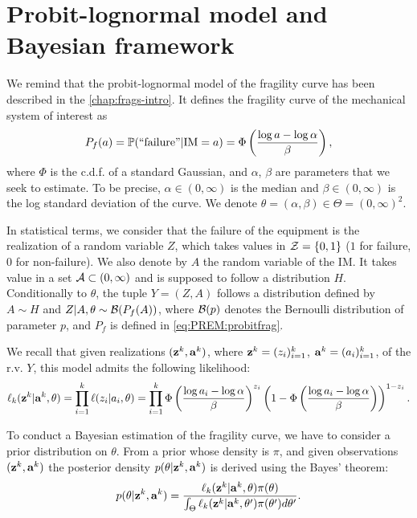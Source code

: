 \section{Probit-lognormal model and Bayesian framework}\label{sec:PREM:model}

We remind that the probit-lognormal model of the fragility curve has been described in the \cref{chap:frags-intro}.
It defines the fragility curve of the mechanical system of interest as 
\begin{equation}\label{eq:PREM:probitfrag}
    P_f(a)=\mathbb{P}(\text{``failure''}|\text{IM}=a) = \Phi\left(\frac{\log a-\log\alpha}{\beta}\right),
\end{equation}
where $\Phi$ is the c.d.f. of a standard Gaussian, and $\alpha$, $\beta$ are parameters that we seek to estimate. To be precise, $\alpha\in(0,\infty)$ is the median and $\beta\in(0,\infty)$ is the log standard deviation of the curve. We denote $\theta=(\alpha,\beta)\in\Theta=(0,\infty)^2$.

In statistical terms, we consider that the failure of the equipment is the realization of a random variable $Z$, which takes values in $\mathcal{Z}=\{0,1\}$ ($1$ for failure, $0$ for non-failure). We also denote by $A$ the random variable of the IM. It takes value in a set $\mathcal{A}\subset(0,\infty)$ and is supposed to follow a distribution $H$. Conditionally to $\theta$, the tuple $Y=(Z,A)$ follows a distribution defined by $A\sim H$ and $Z|A,\theta\sim\mathcal{B}(P_f(A))$, where $\mathcal{B}(p)$ denotes the Bernoulli distribution of parameter $p$, and $P_f$ is defined in \cref{eq:PREM:probitfrag}.

We recall that given realizations $(\mathbf{z}^k,\mathbf{a}^k)$, where $\mathbf{z}^k=(z_i)_{i=1}^k$, $\mathbf{a}^k=(a_i)_{i=1}^k$, of the r.v. $Y$, this model admits the following likelihood:
\begin{equation}\label{eq:PREM:likelihood}
    \ell_k(\mathbf{z}^k|\mathbf{a}^k,\theta) = \prod_{i=1}^k\ell(z_i|a_i,\theta) = \prod_{i=1}^k\Phi\left(\frac{\log a_i-\log\alpha}{\beta}\right)^{z_i}\left(1-\Phi\left(\frac{\log a_i-\log\alpha}{\beta}\right)\right)^{1-z_i}.
\end{equation}


To conduct a Bayesian estimation of the fragility curve, we have to consider a prior distribution on $\theta$.
From a prior whose density is $\pi$, and given observations $(\mathbf{z}^k,\mathbf{a}^k)$ the posterior density $p(\theta|\mathbf{z}^k,\mathbf{a}^k)$ is derived using the Bayes' theorem:
    \begin{equation}\label{eq:PREM:posterior}
        p(\theta|\mathbf{z}^k,\mathbf{a}^k) = \frac{\ell_k(\mathbf{z}^k|\mathbf{a}^k,\theta)\pi(\theta)}{\int_{\Theta}\ell_k(\mathbf{z}^k|\mathbf{a}^k,\theta')\pi(\theta')d\theta'}.
    \end{equation}



